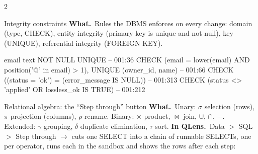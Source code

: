\documentclass[10pt,a4paper]{article}
\newcommand{\code}{\begingroup\catcode`\%=12 \catcode`\#=12 \catcode`\_=12 \catcode`\$=12
  \catcode`\^=12 \catcode`\&=12 \catcode`\~=12 \codeinner}
\newcommand{\codeinner}[1]{\texttt{#1}\endgroup}
\newcommand{\fn}[1]{{\color{fileclr}\texttt{\detokenize{#1}}}}
\newcommand{\what}{{\color{boxc}\bfseries What.}\ }
\newcommand{\where}{{\color{boxc}\bfseries In QLens.}\ }
\begin{document}
\begin{multicols}{2}
\begin{topic}[cRel]{Integrity constraints}
\what Rules the DBMS enforces on every change: domain (type, CHECK), entity integrity (primary key is
unique and not null), key (UNIQUE), referential integrity (FOREIGN KEY).
\begin{sqlc}
email text NOT NULL UNIQUE                                 -- 001:36
      CHECK (email = lower(email) AND position('@' in email) > 1),
UNIQUE (owner_id, name)                                    -- 001:66
CHECK ((status = 'ok') = (error_message IS NULL))          -- 001:313
CHECK (status <> 'applied' OR lossless_ok IS TRUE)         -- 001:212
\end{sqlc}
\end{topic}

\begin{topic}[cAlg]{Relational algebra: the ``Step through'' button}
\what Unary: $\sigma$ selection (rows), $\pi$ projection (columns), $\rho$ rename. Binary: $\times$
product, $\bowtie$ join, $\cup$, $\cap$, $-$. Extended: $\gamma$ grouping, $\delta$ duplicate
elimination, $\tau$ sort.
\where Data $>$ SQL $>$ Step through $\to$ \fn{stepthrough/stages.py:_build L208} cuts one SELECT into a
chain of runnable SELECTs, one per operator, runs each in the sandbox and shows the rows after each step:


\end{topic}
\end{multicols}
\end{document}
